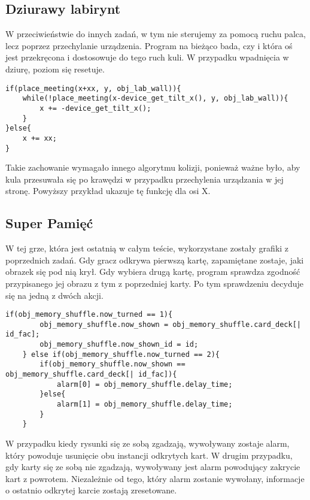 \documentclass[openright]{xmgr}
\begin{document}
\subsection{Dziurawy labirynt}
W przeciwieństwie do innych zadań, w tym nie sterujemy za pomocą ruchu palca, lecz poprzez przechylanie urządzenia. Program na bieżąco bada, czy i która oś jest przekręcona i dostosowuje do tego ruch kuli. W przypadku wpadnięcia w dziurę, poziom się resetuje.

\begin{lstlisting}[caption={Fragment kodu obiektu obj\_player\_ball}]
if(place_meeting(x+xx, y, obj_lab_wall)){
    while(!place_meeting(x-device_get_tilt_x(), y, obj_lab_wall)){
        x += -device_get_tilt_x();
    }
}else{
    x += xx;
}
\end{lstlisting}

Takie zachowanie wymagało innego algorytmu kolizji, ponieważ ważne było, aby kula przesuwała się po krawędzi w przypadku przechylenia urządzania w jej stronę. Powyższy przykład ukazuje tę funkcję dla osi X.


\subsection{Super Pamięć}
W tej grze, która jest ostatnią w całym teście, wykorzystane zostały grafiki z poprzednich zadań. Gdy gracz odkrywa pierwszą kartę, zapamiętane zostaje, jaki obrazek się pod nią krył. Gdy wybiera drugą kartę, program sprawdza zgodność przypisanego jej obrazu z tym z poprzedniej karty. Po tym sprawdzeniu decyduje się na jedną z dwóch akcji.

\begin{lstlisting}[caption={Fragment kodu obiektu obj\_memory\_card}]
    if(obj_memory_shuffle.now_turned == 1){
        obj_memory_shuffle.now_shown = obj_memory_shuffle.card_deck[| id_fac];
        obj_memory_shuffle.now_shown_id = id;
    } else if(obj_memory_shuffle.now_turned == 2){
        if(obj_memory_shuffle.now_shown == obj_memory_shuffle.card_deck[| id_fac]){
            alarm[0] = obj_memory_shuffle.delay_time;
        }else{
            alarm[1] = obj_memory_shuffle.delay_time;
        }
    }
\end{lstlisting}

W przypadku kiedy rysunki się ze sobą zgadzają, wywoływany zostaje alarm, który powoduje usunięcie obu instancji odkrytych kart. W drugim przypadku, gdy karty się ze sobą nie zgadzają, wywoływany jest alarm powodujący zakrycie kart z powrotem. Niezależnie od tego, który alarm zostanie wywołany, informacje o ostatnio odkrytej karcie zostają zresetowane.
\end{document}
